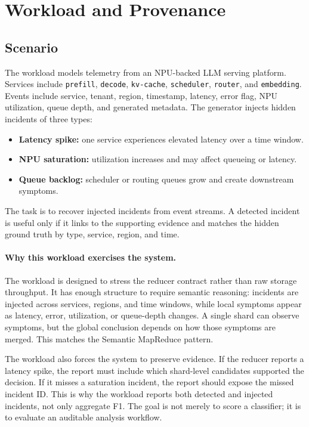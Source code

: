 \documentclass[sigplan,anonymous,nonacm]{acmart}
\newcommand{\systemname}{Semantic MapReduce}
\begin{document}
\section{Workload and Provenance}

\subsection{Scenario}

The workload models telemetry from an NPU-backed LLM serving platform. Services include \texttt{prefill}, \texttt{decode}, \texttt{kv-cache}, \texttt{scheduler}, \texttt{router}, and \texttt{embedding}. Events include service, tenant, region, timestamp, latency, error flag, NPU utilization, queue depth, and generated metadata. The generator injects hidden incidents of three types:

\begin{itemize}[leftmargin=1.6em]
\item \textbf{Latency spike:} one service experiences elevated latency over a time window.
\item \textbf{NPU saturation:} utilization increases and may affect queueing or latency.
\item \textbf{Queue backlog:} scheduler or routing queues grow and create downstream symptoms.
\end{itemize}

The task is to recover injected incidents from event streams. A detected incident is useful only if it links to the supporting evidence and matches the hidden ground truth by type, service, region, and time.

\paragraph{Why this workload exercises the system.}

The workload is designed to stress the reducer contract rather than raw storage throughput. It has enough structure to require semantic reasoning: incidents are injected across services, regions, and time windows, while local symptoms appear as latency, error, utilization, or queue-depth changes. A single shard can observe symptoms, but the global conclusion depends on how those symptoms are merged. This matches the \systemname{} pattern.

The workload also forces the system to preserve evidence. If the reducer reports a latency spike, the report must include which shard-level candidates supported the decision. If it misses a saturation incident, the report should expose the missed incident ID. This is why the workload reports both detected and injected incidents, not only aggregate F1. The goal is not merely to score a classifier; it is to evaluate an auditable analysis workflow.
\end{document}

